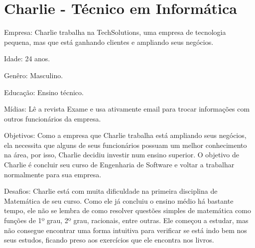 \label{ap:personas}

\section{Charlie - Técnico em Informática}

\begin{figure}[h!]
  \centering
\end{figure}

Empresa: Charlie trabalha na TechSolutions, uma empresa de tecnologia pequena, mas que está ganhando
clientes e ampliando seus negócios.

Idade: 24 anos.

Genêro: Masculino.

Educação: Ensino técnico.

Mídias: Lê a revista Exame e usa ativamente email para trocar informações com 
outros funcionários da empresa.

Objetivos: Como a empresa que Charlie trabalha está ampliando seus negócios, ela
necessita que alguns de seus funcionários possuam um melhor conhecimento na 
área, por isso, Charlie decidiu investir num ensino superior. O objetivo de Charlie é 
concluir seu curso de Engenharia de Software e voltar a trabalhar normalmente 
para sua empresa.

Desafios: Charlie está com muita dificuldade na primeira disciplina de Matemática de seu curso. Como ele já concluiu o ensino médio há bastante tempo, ele não se lembra de como resolver 
questões simples de matemática como funções de 1º grau, 2º grau, racionais, entre outras. Ele começou a estudar, mas 
não consegue encontrar uma forma intuitiva para verificar se está indo bem nos 
seus estudos, ficando preso aos exercícios que ele encontra nos livros.

